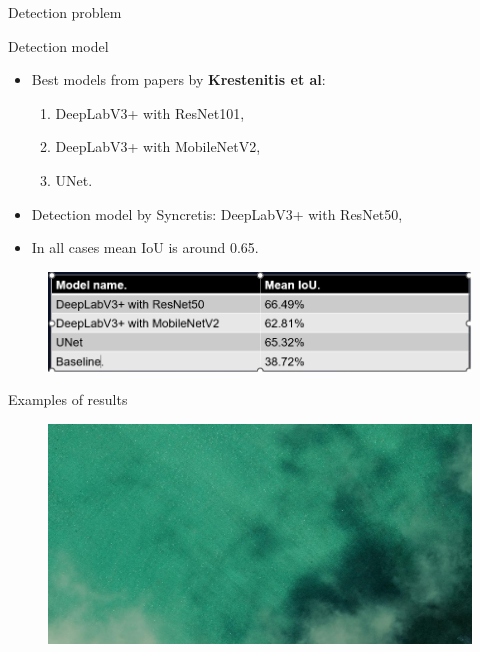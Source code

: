 \documentclass{beamer}
\begin{document}
\begin{section}{Detection problem}
\begin{frame}{Detection model}
	\begin{itemize}
		\item Best models from papers by \textbf{Krestenitis et al}:
		\begin{enumerate}
			\item DeepLabV3+ with ResNet101,
			\item DeepLabV3+ with MobileNetV2,
			\item UNet.
		\end{enumerate}
	    \item Detection model by Syncretis:
	    DeepLabV3+ with ResNet50,
	    \item In all cases mean IoU is around 0.65.
	\end{itemize}

\begin{figure}[H]
	\centering
	\includegraphics[scale=0.6]{table_1_eng.png}
\end{figure}

\end{frame}

\begin{frame}{Examples of results}
\begin{figure}[H]
	\centering
	\includegraphics[scale=0.1]{maxar_maxar_16th_October_27_217_image.png}
\end{figure}


\end{frame}
\end{section}
\end{document}

